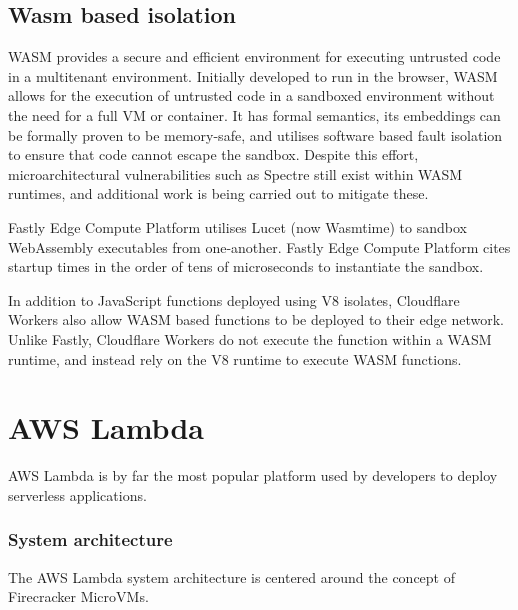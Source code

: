 \subsection{Wasm based isolation}
WASM provides a secure and efficient environment for executing untrusted code\cite{WebAssembly} in a multitenant environment. Initially developed to run in the browser, WASM allows for the execution of untrusted code in a sandboxed environment without the need for a full VM or container. It has formal semantics\cite{haasBringingWebSpeed2017}, its embeddings can be formally proven to be memory-safe\cite{SecurefoundationsVWasm2024}, and utilises software based fault isolation to ensure that code cannot escape the sandbox\cite{SecurityWebAssembly}. Despite this effort, microarchitectural vulnerabilities such as Spectre still exist within WASM runtimes, and additional work is being carried out to mitigate these\cite{narayanSwivelHardeningWebAssembly2021}.

Fastly Edge Compute Platform\cite{EdgeCloudPlatform} utilises Lucet\cite{BytecodeallianceLucet2024} (now Wasmtime\cite{Wasmtime}) to sandbox WebAssembly executables from one-another. Fastly Edge Compute Platform cites startup times in the order of tens of microseconds to instantiate the sandbox.

In addition to JavaScript functions deployed using V8 isolates, Cloudflare Workers\cite{CloudComputingContainers2018} also allow WASM based functions to be deployed to their edge network. Unlike Fastly, Cloudflare Workers do not execute the function within a WASM runtime, and instead rely on the V8 runtime to execute WASM functions\cite{WebAssemblyWasmCloudflare2024}.

\section{AWS Lambda}

AWS Lambda is by far the most popular\cite{eismannReviewServerlessUse2020,StateServerlessDatadog} \faas{} platform used by developers to deploy serverless applications.

\subsubsection{System architecture}

The AWS Lambda system architecture is centered around the concept of Firecracker MicroVMs\cite{agacheFirecrackerLightweightVirtualization2020}.


